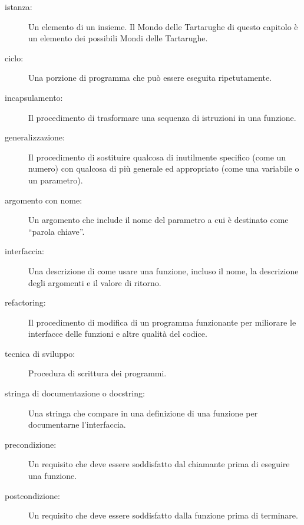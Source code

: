 \documentclass[10pt]{book}
\begin{document}
\begin{description}

\item[istanza:] Un elemento di un insieme. Il Mondo delle Tartarughe di questo capitolo è un elemento dei possibili Mondi delle Tartarughe.

\item[ciclo:] Una porzione di programma che può essere eseguita ripetutamente.

\item[incapsulamento:] Il procedimento di trasformare una sequenza di istruzioni in una funzione.

\item[generalizzazione:] Il procedimento di sostituire qualcosa di inutilmente specifico (come un numero) con qualcosa di più generale ed appropriato (come una variabile o un parametro).

\item[argomento con nome:] Un argomento che include il nome del parametro a cui è destinato come ``parola chiave''.

\item[interfaccia:] Una descrizione di come usare una funzione, incluso il nome, la descrizione degli argomenti e il valore di ritorno.

\item[refactoring:] Il procedimento di modifica di un programma funzionante per miliorare le interfacce delle funzioni e altre qualità del codice.

\item[tecnica di sviluppo:] Procedura di scrittura dei programmi.

\item[stringa di documentazione o docstring:]  Una stringa che compare in una definizione di una funzione per documentarne l'interfaccia.

\item[precondizione:] Un requisito che deve essere soddisfatto dal chiamante prima di eseguire una funzione.

\item[postcondizione:] Un requisito che deve essere soddisfatto dalla funzione prima di terminare.

\end{description}
\end{document}
